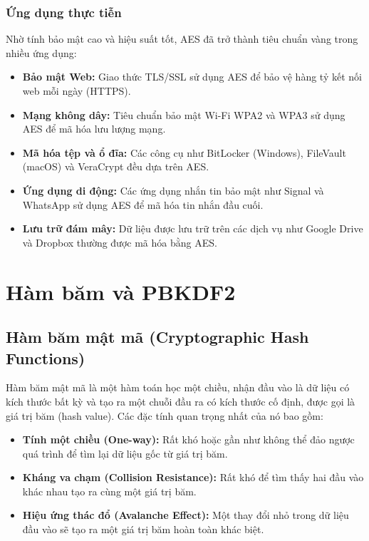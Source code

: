 \subsubsection{Ứng dụng thực tiễn}
Nhờ tính bảo mật cao và hiệu suất tốt, AES đã trở thành tiêu chuẩn vàng trong nhiều ứng dụng:
\begin{itemize}
    \item \textbf{Bảo mật Web:} Giao thức TLS/SSL sử dụng AES để bảo vệ hàng tỷ kết nối web mỗi ngày (HTTPS).
    \item \textbf{Mạng không dây:} Tiêu chuẩn bảo mật Wi-Fi WPA2 và WPA3 sử dụng AES để mã hóa lưu lượng mạng.
    \item \textbf{Mã hóa tệp và ổ đĩa:} Các công cụ như BitLocker (Windows), FileVault (macOS) và VeraCrypt đều dựa trên AES.
    \item \textbf{Ứng dụng di động:} Các ứng dụng nhắn tin bảo mật như Signal và WhatsApp sử dụng AES để mã hóa tin nhắn đầu cuối.
    \item \textbf{Lưu trữ đám mây:} Dữ liệu được lưu trữ trên các dịch vụ như Google Drive và Dropbox thường được mã hóa bằng AES.
\end{itemize}

\section{Hàm băm và PBKDF2}
\subsection{Hàm băm mật mã (Cryptographic Hash Functions)}
Hàm băm mật mã là một hàm toán học một chiều, nhận đầu vào là dữ liệu có kích thước bất kỳ và tạo ra một chuỗi đầu ra có kích thước cố định, được gọi là giá trị băm (hash value). Các đặc tính quan trọng nhất của nó bao gồm:
\begin{itemize}
    \item \textbf{Tính một chiều (One-way):} Rất khó hoặc gần như không thể đảo ngược quá trình để tìm lại dữ liệu gốc từ giá trị băm.
    \item \textbf{Kháng va chạm (Collision Resistance):} Rất khó để tìm thấy hai đầu vào khác nhau tạo ra cùng một giá trị băm.
    \item \textbf{Hiệu ứng thác đổ (Avalanche Effect):} Một thay đổi nhỏ trong dữ liệu đầu vào sẽ tạo ra một giá trị băm hoàn toàn khác biệt.
\end{itemize}

